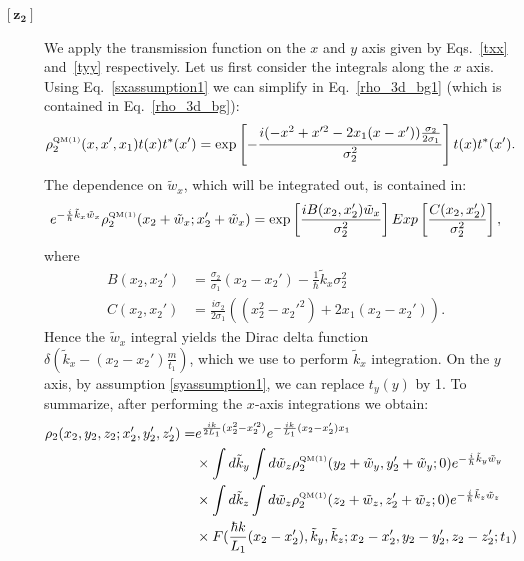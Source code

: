 \documentclass[12pt,groupedaddress,pra,aps]{revtex4-1}
\begin{document}
\begin{description}
\item[$\boldsymbol{[z_2]}$] 
We apply the transmission function on the $x$ and $y$ axis given by  Eqs.~\eqref{txx} and~\eqref{tyy} respectively.  
Let us first consider the integrals along the $x$ axis. Using Eq.~\eqref{sxassumption1} we can simplify in Eq.~\eqref{rho_3d_bg1} (which is contained in Eq.~\eqref{rho_3d_bg}):
\begin{equation}\label{rho_3d_bg2}
\rho^{\text{\tiny QM(1)}}_2(x,x',x_1) t(x)t^*(x')= \exp \left[-\frac{
i( -x^2 + x'^2 -2  x_1 (x- x')) \frac{\sigma_2}{2 \sigma_1 }} 
{\sigma_2^2 }\right] t(x)t^*(x').
\end{equation}
The dependence on $\tilde{w}_x$, which will be integrated out, is contained in:
\begin{equation}\label{xfactors}
e^{-\frac{i}{\hbar}\tilde{k}_x \tilde{w}_x} 
\rho^{\text{\tiny QM(1)}}_2(x_2+\tilde{w}_x;x_2'+\tilde{w}_x) = \exp \left[
\frac{iB(x_2,x_2')\tilde{w}_x}{\sigma_2^2}\right] Exp\left[\frac{ C(x_2,x_2')}{\sigma_2^2}\right],
\end{equation}
where 
\begin{align}
B(x_2,x_2') &= \frac{\sigma_2}{\sigma_1}(x_2-x_2')  - \frac{1}{\hbar} \tilde{k}_x \sigma_2^2 \\
C(x_2,x_2') &= \frac{i\sigma_2}{2\sigma_1} \left( (x_2^2-x_2'^2) + 2x_1 (x_2-x_2') \right).
\end{align}
Hence the $\tilde{w}_x$ integral yields the Dirac delta function $\delta(\tilde{k}_x-(x_2-x_2')\frac{m}{t_1})$, which we use to perform $\tilde{k}_x$ integration. On the $y$ axis, by assumption \eqref{syassumption1}, we can replace $t_y(y)$ by 1. To summarize, after performing the $x$-axis integrations we obtain: 
\begin{equation}\label{rho_3d_ag}
\begin{split}
\rho_2(x_2, y_2, z_2;x'_2, y'_2, z'_2) = 
&e^{\frac{ik}{2L_1}(x_2^2-x_2'^2)}e^{-\frac{ik}{L_1}(x_2-x_2')x_1}\\
& \times\int d\tilde{k}_y \int d\tilde{w}_z \rho^{\text{\tiny QM(1)}}_2(y_2 +\tilde{w}_y ,y'_2 +\tilde{w}_y;0) e^{-\frac{i}{\hbar}\tilde{k}_y \tilde{w}_y} \\
&\times \int d\tilde{k}_z \int d\tilde{w}_z \rho^{\text{\tiny QM(1)}}_2(z_2+\tilde{w}_z,z'_2+\tilde{w}_z;0) e^{-\frac{i}{\hbar}\tilde{k}_z \tilde{w}_z} \\
&\times F(\frac{\hbar k}{L_1}(x_2-x_2'),\tilde{k}_y,\tilde{k}_z;x_2-x_2',y_2-y_2',z_2-z_2';t_1) 
\end{split}
\end{equation}


\end{description}
\end{document}
